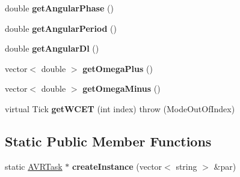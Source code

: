 \begin{DoxyCompactItemize}
\item 
double {\bfseries get\+Angular\+Phase} ()\hypertarget{classRTSim_1_1AVRTask_a439440f28498a8f72c72e05567d1b032}{}\label{classRTSim_1_1AVRTask_a439440f28498a8f72c72e05567d1b032}

\item 
double {\bfseries get\+Angular\+Period} ()\hypertarget{classRTSim_1_1AVRTask_a867228ec4724ec4ae9924a7eced327dd}{}\label{classRTSim_1_1AVRTask_a867228ec4724ec4ae9924a7eced327dd}

\item 
double {\bfseries get\+Angular\+Dl} ()\hypertarget{classRTSim_1_1AVRTask_adc579bebc97c8c65846de19a17b07e96}{}\label{classRTSim_1_1AVRTask_adc579bebc97c8c65846de19a17b07e96}

\item 
vector$<$ double $>$ {\bfseries get\+Omega\+Plus} ()\hypertarget{classRTSim_1_1AVRTask_a21b021b4da53636c4b90cdda1f72a711}{}\label{classRTSim_1_1AVRTask_a21b021b4da53636c4b90cdda1f72a711}

\item 
vector$<$ double $>$ {\bfseries get\+Omega\+Minus} ()\hypertarget{classRTSim_1_1AVRTask_a5257063e4f2d4964434c4221612a0ba4}{}\label{classRTSim_1_1AVRTask_a5257063e4f2d4964434c4221612a0ba4}

\item 
virtual Tick {\bfseries get\+W\+C\+ET} (int index)  throw (\+Mode\+Out\+Of\+Index)\hypertarget{classRTSim_1_1AVRTask_a4d931c613c2562334b9ba664dca2fba6}{}\label{classRTSim_1_1AVRTask_a4d931c613c2562334b9ba664dca2fba6}

\end{DoxyCompactItemize}
\subsection*{Static Public Member Functions}
\begin{DoxyCompactItemize}
\item 
static \hyperlink{classRTSim_1_1AVRTask}{A\+V\+R\+Task} $\ast$ {\bfseries create\+Instance} (vector$<$ string $>$ \&par)\hypertarget{classRTSim_1_1AVRTask_abe52f2c35d0453555966331a42f007c3}{}\label{classRTSim_1_1AVRTask_abe52f2c35d0453555966331a42f007c3}

\end{DoxyCompactItemize}
